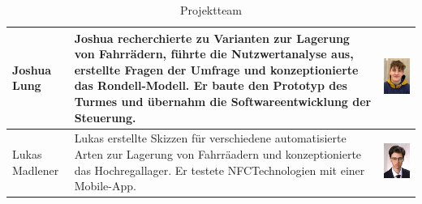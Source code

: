 \begin{table}[H]
\begin{tabular}{lp{}c}
    Joshua Lung    & Joshua recherchierte zu Varianten zur Lagerung von Fahrrädern, führte die Nutzwertanalyse aus, erstellte Fragen der Umfrage und konzeptionierte das Rondell-Modell. Er baute den Prototyp des Turmes und übernahm die Softwareentwicklung der Steuerung. & \begin{minipage}{.3\textwidth}\centering\includegraphics{images/joshualung.jpg} \end{minipage}    \\
    \midrule
    Lukas Madlener & Lukas erstellte Skizzen für verschiedene automatisierte Arten zur Lagerung von Fahrräadern und konzeptionierte das Hochregallager. Er testete NFCTechnologien mit einer Mobile-App.                                                                      & \begin{minipage}{.3\textwidth}\centering\includegraphics{images/lukasmadlener.jpg} \end{minipage} \\
    \bottomrule
  \end{tabular}
  \caption{Projektteam}
  \label{tab:projektteam}
\end{table}

